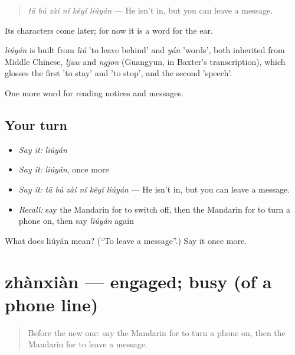 \begin{quote}
\emph{tā bú zài nǐ kěyǐ liúyán} — He isn't in, but you can leave a message.
\end{quote}

Its characters come later; for now it is a word for the ear.

\begin{cousinweb}
\emph{liúyán} is built from \emph{liú} 'to leave behind' and \emph{yán} 'words', both inherited from Middle Chinese, \emph{ljuw} and \emph{ngjon} (Guangyun, in Baxter's transcription), which glosses the first 'to stay' and 'to stop', and the second 'speech'.
\end{cousinweb}

\begin{grammarlens}[title={What you've built}]
One more word for reading notices and messages.
\end{grammarlens}

\subsection*{Your turn}
\begin{itemize}
\raggedright
  \item \emph{Say it:} \emph{liúyán}
  \item \emph{Say it:} \emph{liúyán}, once more
  \item \emph{Say it:} \emph{tā bú zài nǐ kěyǐ liúyán} — He isn't in, but you can leave a message.
  \item \emph{Recall:} say the Mandarin for to switch off, then the Mandarin for to turn a phone on, then say \emph{liúyán} again
\end{itemize}

\begin{tcolorbox}[breakable,colback=teal!4,colframe=teal!35!black,title={Before you move on}]
What does liúyán mean? (\textquotedblleft{}To leave a message\textquotedblright{}.) Say it once more.
\end{tcolorbox}
\section[zhànxiàn]{zhànxiàn — engaged; busy (of a phone line)}

\label{lesson:ZH-C198-zhanxian}



\begin{quote}
Before the new one: say the Mandarin for to turn a phone on, then the Mandarin for to leave a message.
\end{quote}

